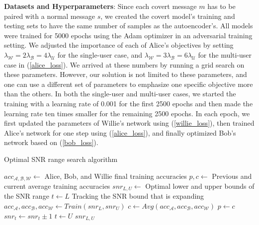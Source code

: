 \textbf{Datasets and Hyperparameters}: Since each covert message \(m\) has to be paired with a normal message \(s\), we created the covert model's training and testing sets to have the same number of samples as the autoencoder's. All models were trained for 5000 epochs using the Adam optimizer in an adversarial training setting. We adjusted the importance of each of Alice's objectives by setting \(\lambda_{\mathcal{W}} = 2 \lambda_{\mathcal{B}} = 4 \lambda_{\mathcal{U}}\) for the single-user case, and \(\lambda_{\mathcal{W}} = 3 \lambda_{\mathcal{B}} = 6 \lambda_{\mathcal{U}}\) for the multi-user case in (\ref{alice_loss}). We arrived at these numbers by running a grid search on these parameters. However, our solution is not limited to these parameters, and one can use a different set of parameters to emphasize one specific objective more than the others. In both the single-user and multi-user cases, we started the training with a learning rate of 0.001 for the first 2500 epochs and then made the learning rate ten times smaller for the remaining 2500 epochs. In each epoch, we first updated the parameters of Willie's network using (\ref{willie_loss}), then trained Alice's network for one step using (\ref{alice_loss}), and finally optimized Bob's network based on (\ref{bob_loss}).

\begin{algorithm}[tp!]
	\caption{Optimal SNR range search algorithm}\label{alg:snr_search}
	\small
	\begin{algorithmic}
		\State $acc_{\mathcal{A, B, W}} \gets$ Alice, Bob, and Willie final training accuracies
		\State $p, c \gets$ Previous and current average training accuracies
		\State $snr_{L, U} \gets$ Optimal lower and upper bounds of the SNR range
		\State $t \gets L$ Tracking the SNR bound that is expanding
		\State $acc_{\mathcal{A}}, acc_{\mathcal{B}}, acc_{\mathcal{W}} \gets Train(snr_{L}, snr_{U})$
		\State $c \gets Avg(acc_{\mathcal{A}}, acc_{\mathcal{B}}, acc_{\mathcal{W}})$
		\State $p \gets c$
		\State $snr_{t} \gets snr_{t} \pm 1$
		\Else
		\State $t \gets U$
		\Else
		\State \Return $snr_{L, U}$
		\EndIf
		\EndIf
		\EndWhile
	\end{algorithmic}
\end{algorithm}

